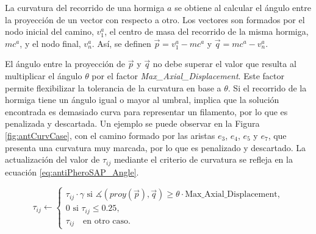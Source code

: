 La curvatura del recorrido de una hormiga $a$ se obtiene al calcular el \'angulo entre la proyecci\'on de un vector con respecto a otro. Los vectores son formados por el nodo inicial del camino, $v^{a}_1$, el centro de masa del recorrido de la misma hormiga, $mc^{a}$, y el nodo final, $v^{a}_n$. As\'i, se definen $\Vec{p} = v^{a}_1 - mc^{a}$ y $\Vec{q} = mc^{a} - v^{a}_n$.





El \'angulo entre la proyecci\'on de $\Vec{p}$ y $\Vec{q}$ no debe superar el valor que resulta al multiplicar el \'angulo $\theta$ por el factor {\it Max\_Axial\_Displacement}. Este factor permite flexibilizar la tolerancia de la curvatura en base a $\theta$. Si el recorrido de la hormiga tiene un \'angulo igual o mayor al umbral, implica que la soluci\'on encontrada es demasiado curva para representar un filamento, por lo que es penalizada y descartada. Un ejemplo se puede observar en la Figura \ref{fig:antCurvCase}, con el camino formado por las aristas $e_3$, $e_4$, $e_5$ y $e_7$, que presenta una curvatura muy marcada, por lo que es penalizado y descartado. La actualizaci\'on del valor de $\tau_{ij}$ mediante el criterio de curvatura se refleja en la ecuaci\'on \ref{eq:antiPheroSAP_Angle}.

\begin{equation}
    \tau_{ij} \leftarrow
        \begin{cases}
        \tau_{ij} \cdot \gamma \text{ si } \measuredangle(proy(\Vec{p}), \Vec{q}) \geq \theta \cdot \text{Max\_Axial\_Displacement},\\[3ex]
        
        \text{0 si } \tau_{ij} \leq 0.25, \\[3ex]
        \tau_{ij} \quad \text{en otro caso.}
        \end{cases}
    \label{eq:antiPheroSAP_Angle}
\end{equation}


